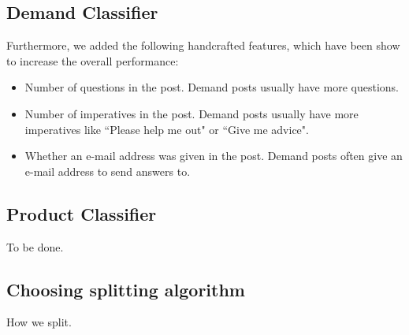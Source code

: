 \subsection{Demand Classifier}
Furthermore, we added the following handcrafted  features, which have been show to increase the overall performance:
\begin{itemize}
	\item Number of questions in the post. Demand posts usually have more questions.
	\item Number of imperatives in the post. Demand posts usually have more imperatives like ``Please help me out" or ``Give me advice".
	\item Whether an e-mail address was given in the post. Demand posts often give an e-mail address to send answers to.
\end{itemize}

\subsection{Product Classifier}
To be done.

\subsection{Choosing splitting algorithm}
How we split.
